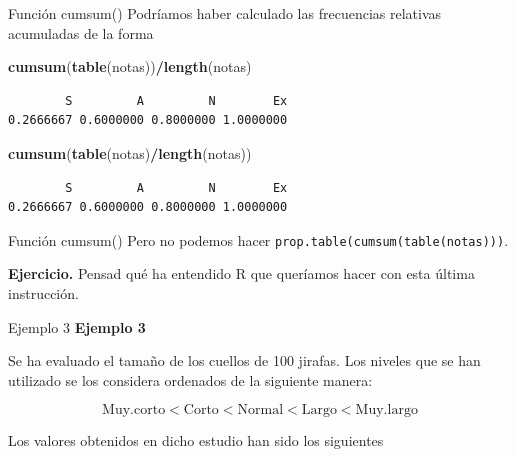 \documentclass[
  ignorenonframetext,
]{beamer}
\newenvironment{Shaded}{\begin{snugshade}}{\end{snugshade}}
\newcommand{\FunctionTok}[1]{\textcolor[rgb]{0.13,0.29,0.53}{\textbf{#1}}}
\newcommand{\NormalTok}[1]{#1}
\newcommand{\SpecialCharTok}[1]{\textcolor[rgb]{0.81,0.36,0.00}{\textbf{#1}}}
\begin{document}
\begin{frame}[fragile]{Función cumsum()}
\label{funciuxf3n-cumsum-9}
Podríamos haber calculado las frecuencias relativas acumuladas de la
forma

\begin{Shaded}
\begin{Highlighting}[]
\FunctionTok{cumsum}\NormalTok{(}\FunctionTok{table}\NormalTok{(notas))}\SpecialCharTok{/}\FunctionTok{length}\NormalTok{(notas)}
\end{Highlighting}
\end{Shaded}

\begin{verbatim}
        S         A         N        Ex 
0.2666667 0.6000000 0.8000000 1.0000000 
\end{verbatim}

\begin{Shaded}
\begin{Highlighting}[]
\FunctionTok{cumsum}\NormalTok{(}\FunctionTok{table}\NormalTok{(notas)}\SpecialCharTok{/}\FunctionTok{length}\NormalTok{(notas))}
\end{Highlighting}
\end{Shaded}

\begin{verbatim}
        S         A         N        Ex 
0.2666667 0.6000000 0.8000000 1.0000000 
\end{verbatim}
\end{frame}

\begin{frame}[fragile]{Función cumsum()}
\label{funciuxf3n-cumsum-10}
Pero no podemos hacer \texttt{prop.table(cumsum(table(notas)))}.

\textbf{Ejercicio.} Pensad qué ha entendido R que queríamos hacer con
esta última instrucción.
\end{frame}

\begin{frame}{Ejemplo 3}
\label{ejemplo-3-5}
\textbf{Ejemplo 3}

Se ha evaluado el tamaño de los cuellos de 100 jirafas. Los niveles que
se han utilizado se los considera ordenados de la siguiente manera:

\[\text{Muy.corto}<\text{Corto}<\text{Normal}<\text{Largo}<\text{Muy.largo}\]

Los valores obtenidos en dicho estudio han sido los siguientes
\end{frame}
\end{document}
